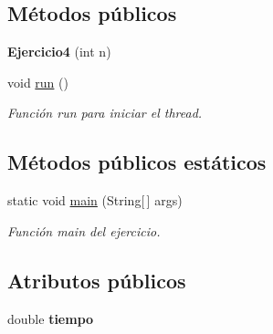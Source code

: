\subsection*{Métodos públicos}
\begin{DoxyCompactItemize}
\item 
\hypertarget{class_ejercicio1__2__4_1_1_ejercicio4_aad168e519e47728e00714a20bf4e5071}{}{\bfseries Ejercicio4} (int n)\label{class_ejercicio1__2__4_1_1_ejercicio4_aad168e519e47728e00714a20bf4e5071}

\item 
\hypertarget{class_ejercicio1__2__4_1_1_ejercicio4_a650342d160590b886c63eace2388cd10}{}void \hyperlink{class_ejercicio1__2__4_1_1_ejercicio4_a650342d160590b886c63eace2388cd10}{run} ()\label{class_ejercicio1__2__4_1_1_ejercicio4_a650342d160590b886c63eace2388cd10}

\begin{DoxyCompactList}\small\item\em Función run para iniciar el thread. \end{DoxyCompactList}\end{DoxyCompactItemize}
\subsection*{Métodos públicos estáticos}
\begin{DoxyCompactItemize}
\item 
\hypertarget{class_ejercicio1__2__4_1_1_ejercicio4_ae0107d9c149901d15ff64fd908452f92}{}static void \hyperlink{class_ejercicio1__2__4_1_1_ejercicio4_ae0107d9c149901d15ff64fd908452f92}{main} (String\mbox{[}$\,$\mbox{]} args)\label{class_ejercicio1__2__4_1_1_ejercicio4_ae0107d9c149901d15ff64fd908452f92}

\begin{DoxyCompactList}\small\item\em Función main del ejercicio. \end{DoxyCompactList}\end{DoxyCompactItemize}
\subsection*{Atributos públicos}
\begin{DoxyCompactItemize}
\item 
\hypertarget{class_ejercicio1__2__4_1_1_ejercicio4_a358d67eb8478ad0a754c0f408de35bbb}{}double {\bfseries tiempo}\label{class_ejercicio1__2__4_1_1_ejercicio4_a358d67eb8478ad0a754c0f408de35bbb}

\end{DoxyCompactItemize}


